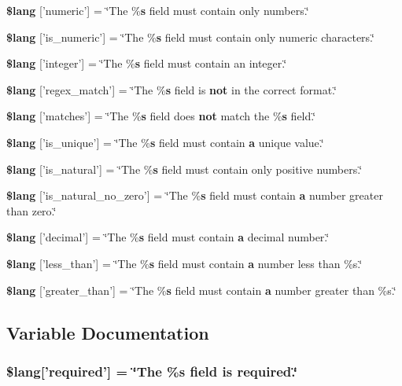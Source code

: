 \begin{DoxyCompactItemize}
\item 
{\bf \$lang} ['numeric'] = \char`\"{}The \%{\bf s} field must contain only numbers.\char`\"{}
\item 
{\bf \$lang} ['is\-\_\-numeric'] = \char`\"{}The \%{\bf s} field must contain only numeric characters.\char`\"{}
\item 
{\bf \$lang} ['integer'] = \char`\"{}The \%{\bf s} field must contain an integer.\char`\"{}
\item 
{\bf \$lang} ['regex\-\_\-match'] = \char`\"{}The \%{\bf s} field is {\bf not} in the correct format.\char`\"{}
\item 
{\bf \$lang} ['matches'] = \char`\"{}The \%{\bf s} field does {\bf not} match the \%{\bf s} field.\char`\"{}
\item 
{\bf \$lang} ['is\-\_\-unique'] = \char`\"{}The \%{\bf s} field must contain {\bf a} unique value.\char`\"{}
\item 
{\bf \$lang} ['is\-\_\-natural'] = \char`\"{}The \%{\bf s} field must contain only positive numbers.\char`\"{}
\item 
{\bf \$lang} ['is\-\_\-natural\-\_\-no\-\_\-zero'] = \char`\"{}The \%{\bf s} field must contain {\bf a} number greater than zero.\char`\"{}
\item 
{\bf \$lang} ['decimal'] = \char`\"{}The \%{\bf s} field must contain {\bf a} decimal number.\char`\"{}
\item 
{\bf \$lang} ['less\-\_\-than'] = \char`\"{}The \%{\bf s} field must contain {\bf a} number less than \%s.\char`\"{}
\item 
{\bf \$lang} ['greater\-\_\-than'] = \char`\"{}The \%{\bf s} field must contain {\bf a} number greater than \%s.\char`\"{}
\end{DoxyCompactItemize}


\subsection{Variable Documentation}
\subsubsection[{\$lang}]{\setlength{\rightskip}{0pt plus 5cm}\$lang['required'] = \char`\"{}The \%{\bf s} field is required.\char`\"{}}\label{form__validation__lang_8php_ac05864968b28fa7a4476f49e6b8d4433}


